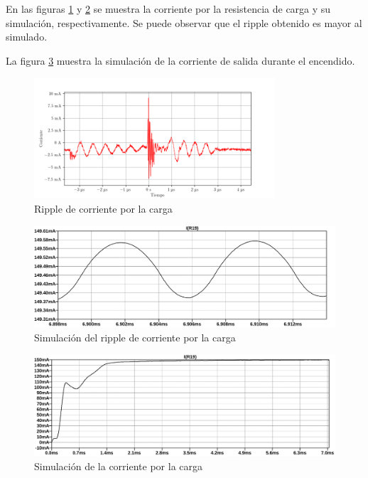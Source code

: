En las figuras \ref{fig:osc:67} y \ref{fig:sim:14ripple} se muestra la corriente por la resistencia de carga y su simulación, respectivamente. Se puede observar que el ripple obtenido es mayor al simulado.

La figura \ref{fig:sim:14} muestra la simulación de la corriente de salida durante el encendido.


\begin{figure}[H]
    \centering
    \includegraphics[width=0.8\textwidth]{images/capturas-osciloscopio/17-11-2022/67.png}
    \caption{Ripple de corriente por la carga}
    \label{fig:osc:67}
\end{figure}

\begin{figure}[H]
    \centering
    \includegraphics[width=\textwidth]{images/sim/14-ripple.pdf}
    \caption{Simulación del ripple de corriente por la carga}
    \label{fig:sim:14ripple}
\end{figure}

\begin{figure}[H]
    \centering
    \includegraphics[width=\textwidth]{images/sim/14.pdf}
    \caption{Simulación de la corriente por la carga}
    \label{fig:sim:14}
\end{figure}


